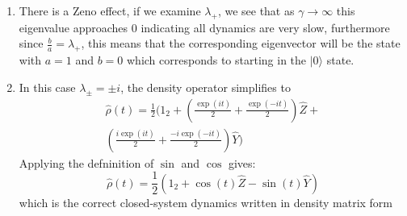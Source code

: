 \documentclass[english]{article}
\newcommand{\ket}[1]{|#1 \rangle}
\begin{document}
\begin{enumerate}
\begin{enumerate}
Therefore, If I write my density matrix as $1_2+a \hat{Z}+b\hat{Y}$, than I can see that $a$ and $b$ obey the following matrix differential equation
\begin{equation}
\frac{\partial}{\partial t}\left(\begin{array}{c} a \\ b \end{array}\right)=\left(\begin{array}{cc} 0 & 1 \\ -1 & -2 \gamma \end{array} \right)\left(\begin{array}{c} a \\ b \end{array}\right)
\end{equation}
The eigenvalue equation becomes $\lambda^2-2 \gamma \lambda+1=0$
 We therefore have $\lambda_{\pm}=-\gamma\pm\sqrt{\gamma^2-1}$. The eigenvector equation takes a simple form $\frac{b}{a}=\lambda_{\pm}$, the normalized eigenvectors are therefore $\frac{1}{\sqrt{1+|\lambda_\pm|^2}}\left(\begin{array}{c} 1 \\ \lambda_\pm \end{array}\right)$, where the overlap of the initial state with each eigenstate is $\frac{1}{\sqrt{1+|\lambda_\pm|^2}}$ putting this all together we have
\begin{align}
\hat{\rho}(t)=
\frac{1}{2}(1_2+\left(\frac{\exp(\lambda_+ t)}{1+|\lambda_+|^2}+\frac{\exp(\lambda_-  t)}{1+|\lambda_-|^2}\right)\hat{Z}+ \nonumber\\ \left(\frac{\lambda_+\exp(\lambda_+ t)}{1+|\lambda_+|^2}+\frac{\lambda_-\exp(\lambda_-  t)}{1+|\lambda_-|^2}\right)\hat{Y})
\end{align}
\item There is a Zeno effect, if we examine $\lambda_{+}$, we see that as $\gamma \rightarrow \infty$ this eigenvalue approaches $0$ indicating all dynamics are very slow, furthermore since $\frac{b}{a}=\lambda_{+}$, this means that the corresponding eigenvector will be the state with $a=1$ and $b=0$ which corresponds to starting in the $\ket{0}$ state.
\item In this case $\lambda_{\pm}=\pm i$, the density operator simplifies to 
\begin{align}
\hat{\rho}(t)=
\frac{1}{2}(1_2+\left(\frac{\exp(it)}{2}+\frac{\exp(-i t)}{2}\right)\hat{Z}+ \nonumber\\ \left(\frac{i\exp(it)}{2}+\frac{-i\exp(-it)}{2}\right)\hat{Y})
\end{align}
Applying the defninition of $\sin$ and $\cos$ gives:
\begin{equation}
\hat{\rho}(t)=
\frac{1}{2}(1_2+\cos(t)\hat{Z}-\sin(t)\hat{Y})
\end{equation}
which is the correct closed-system dynamics written in density matrix form
\end{enumerate}

\end{enumerate}
\end{document}
